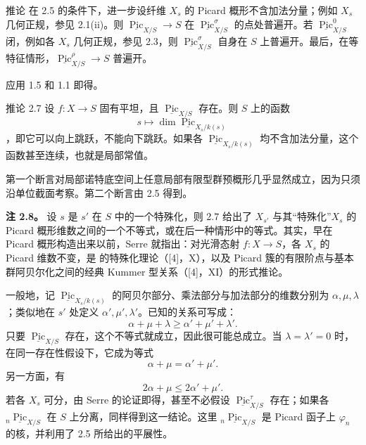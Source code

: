\begin{statement}{推论}
在 2.5 的条件下，进一步设纤维 $X_s$ 的 Picard 概形不含加法分量；例如 $X_s$ 几何正规，参见 2.1(ii)。则 $\underline{\operatorname{Pic}}_{X/S}\to S$ 在 $\underline{\operatorname{Pic}}^\sigma_{X/S}$ 的点处普遍开。若 $\underline{\operatorname{Pic}}^0_{X/S}$ 闭，例如各 $X_s$ 几何正规，参见 2.3，则 $\underline{\operatorname{Pic}}^\sigma_{X/S}$ 自身在 $S$ 上普遍开。最后，在等特征情形，$\underline{\operatorname{Pic}}^\rho_{X/S}\to S$ 普遍开。
\end{statement}
应用 1.5 和 1.1 即得。

\begin{statement}{推论 2.7}
设 $f\colon X\to S$ 固有平坦，且 $\underline{\operatorname{Pic}}_{X/S}$ 存在。则 $S$ 上的函数
\[
 s\longmapsto\dim\underline{\operatorname{Pic}}_{X_s/k(s)}
\]
，即它可以向上跳跃，不能向下跳跃。如果各 $\underline{\operatorname{Pic}}_{X_s/k(s)}$ 均不含加法分量，这个函数甚至连续，也就是局部常值。
\end{statement}
第一个断言对局部诺特底空间上任意局部有限型群预概形几乎显然成立，因为只须沿单位截面考察。第二个断言由 2.5 得到。

\textbf{注 2.8。} 设 $s$ 是 $s'$ 在 $S$ 中的一个特殊化，则 2.7 给出了 $X_{s'}$ 与其“特殊化”$X_s$ 的 Picard 概形维数之间的一个不等式，或在后一种情形中的等式。其实，早在 Picard 概形构造出来以前，Serre 就指出：对光滑态射 $f\colon X\to S$，各 $X_s$ 的 Picard 维数不变，是 的特殊化理论（[4]，X），以及 Picard 簇的有限阶点与基本群阿贝尔化之间的经典 Kummer 型关系（[4]，XI）的形式推论。

一般地，记 $\underline{\operatorname{Pic}}_{X_s/k(s)}$ 的阿贝尔部分、乘法部分与加法部分的维数分别为 $\alpha,\mu,\lambda$；类似地在 $s'$ 处定义 $\alpha',\mu',\lambda'$。已知的关系可写成：
\begin{equation}\label{pp-specialization-star}
 \alpha+\mu+\lambda\geq\alpha'+\mu'+\lambda'.\tag{*}
\end{equation}
只要 $\underline{\operatorname{Pic}}_{X/S}$ 存在，这个不等式就成立，因此很可能总成立。当 $\lambda=\lambda'=0$ 时，在同一存在性假设下，它成为等式
\[
 \alpha+\mu=\alpha'+\mu'.
\]
另一方面，有
\begin{equation}\label{pp-specialization-starstar}
 2\alpha+\mu\leq2\alpha'+\mu'.\tag{**}
\end{equation}
若各 $X_s$ 可分，由 Serre 的论证即得，甚至不必假设 $\underline{\operatorname{Pic}}^\tau_{X/S}$ 存在；如果各 ${}_n\underline{\operatorname{Pic}}_{X/S}$ 在 $S$ 上分离，同样得到这一结论。这里 ${}_n\underline{\operatorname{Pic}}_{X/S}$ 是 Picard 函子上 $\varphi_n$ 的核，并利用了 2.5 所给出的平展性。

